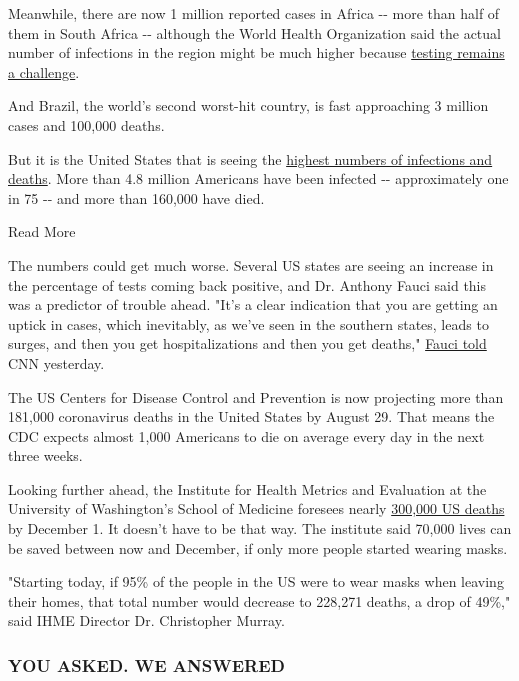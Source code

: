 Meanwhile, there are now 1 million reported cases in Africa -\/- more
than half of them in South Africa -\/- although the World Health
Organization said the actual number of infections in the region might be
much higher because
\href{https://cnn.com/world/live-news/coronavirus-pandemic-08-07-20-intl/h_a189fc2d94d7d9b51b92fcdf1bdf664e}{testing
remains a challenge}.

And Brazil, the world's second worst-hit country, is fast approaching 3
million cases and 100,000 deaths.

But it is the United States that is seeing the
\href{http://www.cnn.com/2020/08/07/health/us-coronavirus-friday/index.html}{highest
numbers of infections and deaths}. More than 4.8 million Americans have
been infected -\/- approximately one in 75 -\/- and more than 160,000
have died.

Read More

The numbers could get much worse. Several US states are seeing an
increase in the percentage of tests coming back positive, and Dr.
Anthony Fauci said this was a predictor of trouble ahead. "It's a clear
indication that you are getting an uptick in cases, which inevitably, as
we've seen in the southern states, leads to surges, and then you get
hospitalizations and then you get deaths,"
\href{https://cnn.com/videos/health/2020/08/06/dr-anthony-fauci-birx-warning-trouble-ahead-newday-vpx.cnn}{Fauci
told} CNN yesterday.

The US Centers for Disease Control and Prevention is now projecting more
than 181,000 coronavirus deaths in the United States by August 29. That
means the CDC expects almost 1,000 Americans to die on average every day
in the next three weeks.

Looking further ahead, the Institute for Health Metrics and Evaluation
at the University of Washington's School of Medicine foresees nearly
\href{http://www.cnn.com/2020/08/06/health/us-coronavirus-thursday/index.html}{300,000
US deaths} by December 1. It doesn't have to be that way. The institute
said 70,000 lives can be saved between now and December, if only more
people started wearing masks.

"Starting today, if 95\% of the people in the US were to wear masks when
leaving their homes, that total number would decrease to 228,271 deaths,
a drop of 49\%," said IHME Director Dr. Christopher Murray.

\hypertarget{you-asked-we-answered}{%
\subsubsection{\texorpdfstring{\textbf{YOU ASKED. WE
ANSWERED}}{YOU ASKED. WE ANSWERED}}\label{you-asked-we-answered}}

